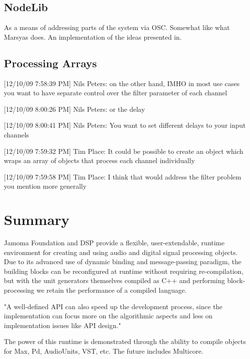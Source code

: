 \documentclass[twoside,10pt]{article}
\begin{document}
\subsection{NodeLib}

As a means of addressing parts of the system via OSC.  Somewhat like what Marsyas does.  An implementation of the ideas presented in\cite{Place:2008osc}.


\subsection{Processing Arrays}

[12/10/09 7:58:39 PM] Nils Peters: on the other hand, IMHO in most use cases you want to have separate control over the filter parameter of each channel

[12/10/09 8:00:26 PM] Nils Peters: or the delay

[12/10/09 8:00:41 PM] Nils Peters: You want to set different delays to your input channels

[12/10/09 7:59:32 PM] Tim Place: It could be possible to create an object which wraps an array of objects that process each channel individually

[12/10/09 7:59:58 PM] Tim Place: I think that would address the filter problem you mention more generally





\section{Summary} %

Jamoma Foundation and DSP provide a flexible, user-extendable, runtime environment for creating and using audio and digital signal processing objects.  Due to its advanced use of dynamic binding and message-passing paradigm, the building blocks can be reconfigured at runtime without requiring re-compilation, but with the unit generators themselves compiled as C++ and performing block-processing we retain the performance of a compiled language.


"A well-defined API can also speed up the development process, since the implementation can focus more on the algorithmic aspects and less on implementation issues like API design." \cite{Lerch:2005}

The power of this runtime is demonstrated through the ability to compile objects for Max, Pd, AudioUnits, VST, etc.  The future includes Multicore.
\end{document}
